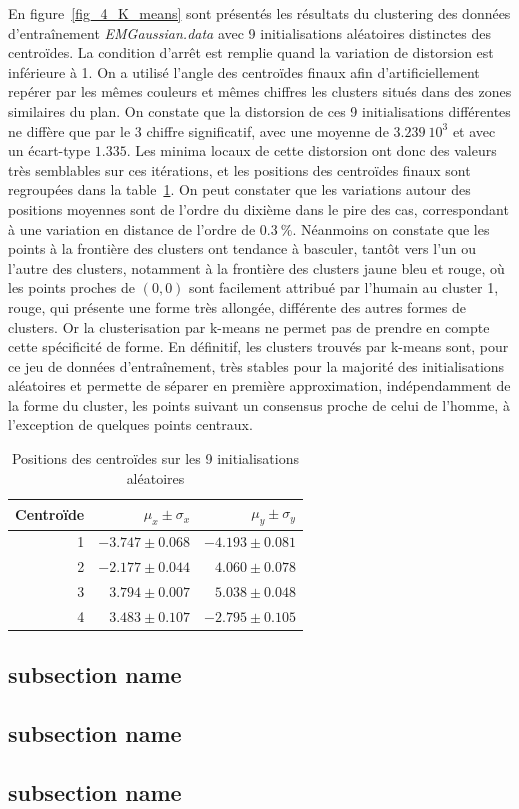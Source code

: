 \documentclass[12pt,a4paper,onecolumn]{article}
\begin{document}
En figure~\ref{fig_4_K_means} sont présentés les résultats du clustering des données d'entraînement \textit{EMGaussian.data} avec 9 initialisations aléatoires distinctes des centroïdes. La condition d'arrêt est remplie quand la variation de distorsion est inférieure à 1. On a utilisé l'angle des centroïdes finaux afin d'artificiellement repérer par les mêmes couleurs et mêmes chiffres les clusters situés dans des zones similaires du plan. On constate que la distorsion de ces 9 initialisations différentes ne diffère que par le 3 chiffre significatif, avec une moyenne de \(3.239~10^{3}\) et avec un écart-type \(1.335\). Les minima locaux de cette distorsion ont donc des valeurs très semblables sur ces itérations, et les positions des centroïdes finaux sont regroupées dans la table~\ref{tab_4_a}. On peut constater que les variations autour des positions moyennes sont de l'ordre du dixième dans le pire des cas, correspondant à une variation en distance de l'ordre de \(0.3~\%\). Néanmoins on constate que les points à la frontière des clusters ont tendance à basculer, tantôt vers l'un ou l'autre des clusters, notamment à la frontière des clusters jaune bleu et rouge, où les points proches de \((0,0)\) sont facilement attribué par l'humain au cluster 1, rouge, qui présente une forme très allongée, différente des autres formes de clusters. Or la clusterisation par k-means ne permet pas de prendre en compte cette spécificité de forme. En définitif, les clusters trouvés par k-means sont, pour ce jeu de données d'entraînement, très stables pour la majorité des initialisations aléatoires et permette de séparer en première approximation, indépendamment de la forme du cluster, les points suivant un consensus proche de celui de l'homme, à l'exception de quelques points centraux.

\begin{table}
	\centering
	\begin{tabular}{r|r|r}
		\hline
		Centroïde & \(\mu_x \pm \sigma_x\) & \(\mu_y \pm \sigma_y\) \\\hline
		1         & \(-3.747\pm 0.068\)    & \(-4.193\pm 0.081\)    \\\hline
		2         & \( -2.177 \pm 0.044\)  & \( 4.060\pm 0.078 \)   \\\hline
		3         & \( 3.794\pm 0.007\)    & \( 5.038\pm 0.048\)    \\\hline
		4         & \( 3.483\pm 0.107\)    & \( -2.795\pm 0.105 \)  \\\hline
	\end{tabular}
	\caption{Positions des centroïdes sur les 9 initialisations aléatoires}
	\label{tab_4_a}
\end{table}

\subsection{subsection name}

\subsection{subsection name}

\subsection{subsection name}
\end{document}
